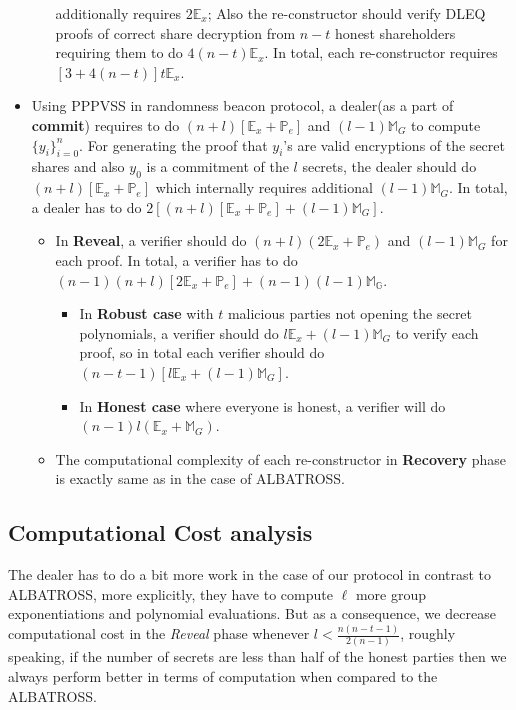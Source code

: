 \begin{itemize}
\begin{itemize}
            additionally requires $2\mathbb{E}_x$; Also the re-constructor 
            should verify DLEQ proofs of correct share decryption from $n-t$ 
            honest shareholders requiring them to do $4(n-t)\mathbb{E}_{x}$. 
            In total, each re-constructor requires $[3+4(n-t)]t\mathbb{E}_{x}$.
        \end{itemize}
    \item Using PPPVSS in randomness beacon protocol, a dealer(as a part of \textbf{commit}) requires to do $(n+l)[\mathbb{E}_x+\mathbb{P}_e]$ and $(l-1)\mathbb{M}_G$ to compute $\{y_i\}_{i=0}^{n}$. For generating the proof that $y_i$'s are valid encryptions of the secret shares and also $y_0$ is a commitment of the $l$ secrets, the dealer should do $(n+l)[\mathbb{E}_x+\mathbb{P}_e]$ which internally requires additional $(l-1)\mathbb{M}_G$. In total, a dealer has to do $2\left[(n+l)[\mathbb{E}_x+\mathbb{P}_e]+(l-1)\mathbb{M}_{G}\right]$.
    \begin{itemize}
        \item In \textbf{Reveal}, a verifier should do $(n+l)(2\mathbb{E}_x+\mathbb{P}_e)$ and $(l-1)\mathbb{M}_G$ for each proof. In total, a verifier has to do $(n-1)(n+l)[2\mathbb{E}_x+\mathbb{P}_e]+(n-1)(l-1)\mathbb{M_G}$.
        \begin{itemize}
            \item In \textbf{Robust case} with $t$ malicious parties not opening the secret polynomials, a verifier should do $l\mathbb{E}_x+(l-1)\mathbb{M}_G$ to verify each proof, so in total each verifier should do $(n-t-1)[l\mathbb{E}_x+(l-1)\mathbb{M}_G]$.
            \item In \textbf{Honest case} where everyone is honest, a verifier will do $(n-1)l(\mathbb{E}_x+\mathbb{M}_G)$.
        \end{itemize}
        \item The computational complexity of each re-constructor in \textbf{Recovery} phase is exactly same as in the case of ALBATROSS.
    \end{itemize}
\end{itemize}

\subsection{Computational Cost analysis}
The dealer has to do a bit more work in the case of our protocol in contrast to ALBATROSS, more explicitly, 
they have to compute $\ell$ more group exponentiations and polynomial evaluations. But as a consequence, 
we decrease computational cost in the \textit{Reveal} phase whenever $l < \frac{n(n-t-1)}{2(n-1)}$, roughly 
speaking, if the number of secrets are less than half of the honest parties then we always perform better in 
terms of computation when compared to the ALBATROSS.


